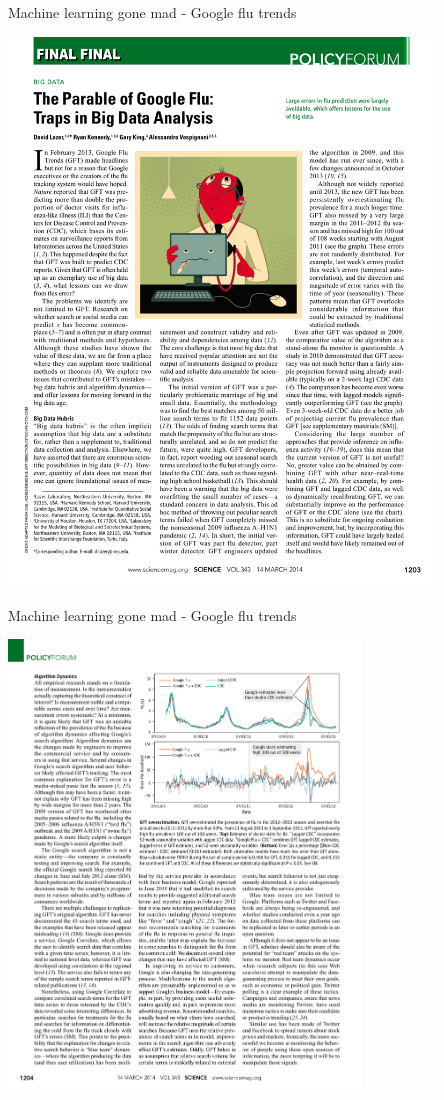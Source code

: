 \documentclass[pdf]{beamer}
\begin{document}
\begin{frame}{Machine learning gone mad - Google flu trends}
\begin{center}
		\includegraphics[width=0.85\textwidth]{googleFluTrend2.pdf}
\end{center}
\end{frame}
\begin{frame}{Machine learning gone mad - Google flu trends}
\begin{center}
		\includegraphics[width=0.7\textwidth]{googleFluTrend3.pdf}
\end{center}
\end{frame}
\end{document}
